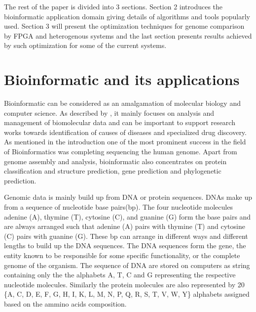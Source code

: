 \documentclass[12pt,twoside]{article}
\begin{document}
The rest of the paper is divided into 3 sections. Section 2 introduces the bioinformatic application domain giving
details of algorithms and tools popularly used. Section 3 will present the optimization techniques for genome
comparison by FPGA and heterogenous systems and the last section presents results achieved by such optimization
for some of the current systems.

\section {Bioinformatic and its applications}

Bioinformatic can be considered as an amalgamation of molecular biology and computer science.
As described by \textcite[chapter 8]{gokhale_reconfigurable_2010}, it mainly focuses on analysis
and management of biomolecular data and can be important to support research works towards
identification of causes of diseases and specialized drug discovery. As mentioned in the
introduction one of the most prominent success in the field of Bioinformatics was completing
sequencing the human genome. Apart from genome assembly and analysis, bioinformatic also
concentrates on protein classification and structure prediction, gene prediction and phylogenetic
prediction.

Genomic data is mainly build up from DNA or protein sequences. DNAs make up from a sequence of
nucleotide base pairs(bp). The four nucleotide molecules adenine (A), thymine (T), cytosine (C), and guanine (G)
form the base pairs and are always arranged such that adenine (A) pairs with thymine (T) and
cytosine (C) pairs with guanine (G). These bp can arrange in different ways and different lengths to build up the DNA
sequences. The DNA sequences form the gene, the entity known to be responsible for some specific functionality,
or the complete genome of the organism. The sequence of DNA are stored on computers as string containing only the
the alphabets A, T, C and G representing the respective nucleotide molecules. Similarly the protein molecules
are also represented by 20 \{A, C, D, E, F, G, H, I, K, L, M, N, P, Q, R, S, T, V, W, Y\} alphabets assigned
based on the ammino acids composition.
\end{document}
